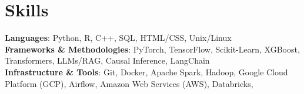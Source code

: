 \documentclass[letterpaper,11pt]{article}
\begin{document}
\section{Skills}
 \begin{itemize}[leftmargin=0.15in, label={}]
    \small{\item{
     \textbf{Languages}{: Python, R, C++, SQL, HTML/CSS, Unix/Linux} \\
     \textbf{Frameworks \& Methodologies}{: PyTorch, TensorFlow, Scikit-Learn, XGBoost, Transformers, LLMs/RAG, Causal Inference, LangChain} \\
     \textbf{Infrastructure \& Tools}{: Git, Docker, Apache Spark, Hadoop, Google Cloud Platform (GCP), Airflow, Amazon Web Services (AWS), Databricks,}
     }}
 \end{itemize}

\end{document}
